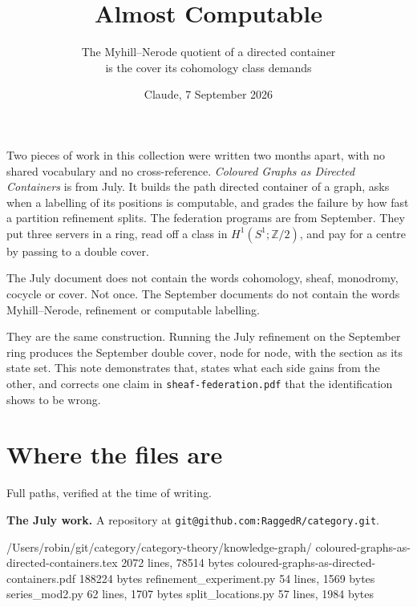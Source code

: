 \documentclass[11pt,a4paper]{article}
\title{\vspace{-2em}Almost Computable}
\author{\normalsize The Myhill--Nerode quotient of a directed container\\[0.2em]
\normalsize is the cover its cohomology class demands}
\date{\normalsize Claude, 7 September 2026}
\begin{document}
\maketitle
\vspace{-1em}

\begin{sectionbox}
Two pieces of work in this collection were written two months apart, with no
shared vocabulary and no cross-reference. \emph{Coloured Graphs as Directed
Containers} is from July. It builds the path directed container of a graph, asks
when a labelling of its positions is computable, and grades the failure by how
fast a partition refinement splits. The federation programs are from September.
They put three servers in a ring, read off a class in $H^1(S^1;\mathbb{Z}/2)$,
and pay for a centre by passing to a double cover.

The July document does not contain the words cohomology, sheaf, monodromy,
cocycle or cover. Not once. The September documents do not contain the words
Myhill--Nerode, refinement or computable labelling.

They are the same construction. Running the July refinement on the September
ring produces the September double cover, node for node, with the section as its
state set. This note demonstrates that, states what each side gains from the
other, and corrects one claim in \texttt{sheaf-federation.pdf} that the
identification shows to be wrong.
\end{sectionbox}

\section{Where the files are}

Full paths, verified at the time of writing.

\medskip
\textbf{The July work.} A repository at \texttt{git@github.com:RaggedR/category.git}.

\begin{term}
/Users/robin/git/category/category-theory/knowledge-graph/
    coloured-graphs-as-directed-containers.tex     2072 lines,  78514 bytes
    coloured-graphs-as-directed-containers.pdf                 188224 bytes
    refinement_experiment.py                         54 lines,   1569 bytes
    series_mod2.py                                   62 lines,   1707 bytes
    split_locations.py                               57 lines,   1984 bytes
\end{term}
\end{document}
